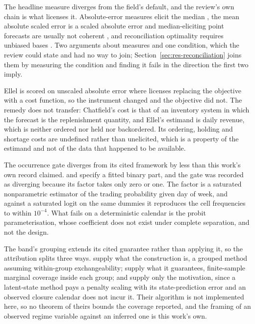 The headline measure diverges from the field's default, and the review's own chain is what
licenses it. Absolute-error measures elicit the median \citep{hewamalage_forecast_2023}, the mean
absolute scaled error is a scaled absolute error and median-eliciting point forecasts are usually
not coherent \citep{kolassa_we_2023}, and reconciliation optimality requires unbiased bases
\citep{wickramasuriya_optimal_2019}. Two arguments about measures and one condition, which the
review could state and had no way to join; Section~\ref{sec:res-reconciliation} joins them by
measuring the condition and finding it fails in the direction the first two imply.

Ellel is scored on unscaled absolute error where \citet{chatfield_all-zero_2007} licenses
replacing the objective with a cost function, so the instrument changed and the objective did
not. The remedy does not transfer: Chatfield's cost is that of an inventory system in which the
forecast is the replenishment quantity, and Ellel's estimand is daily revenue, which is neither
ordered nor held nor backordered. Its ordering, holding and shortage costs are undefined rather
than unelicited, which is a property of the estimand and not of the data that happened to be
available.

The occurrence gate diverges from its cited framework by less than this work's own record
claimed. \citet{cragg_statistical_1971} and \citet{mullahy_specification_1986} specify a fitted
binary part, and the gate was recorded as diverging because its factor takes only zero or one.
The factor is a saturated nonparametric estimator of the trading probability given day of week,
and against a saturated logit on the same dummies it reproduces the cell frequencies to within
$10^{-4}$. What fails on a deterministic calendar is the probit parameterisation, whose
coefficient does not exist under complete separation, and not the design.

The band's grouping extends its cited guarantee rather than applying it, so the attribution
splits three ways. \citet{barber_conformal_2023} supply what the construction is, a grouped
method assuming within-group exchangeability; \citet{stocker_gentle_2025} supply what it
guarantees, finite-sample marginal coverage inside each group; and \citet{sun_conformal_2025}
supply only the motivation, since a latent-state method pays a penalty scaling with its
state-prediction error and an observed closure calendar does not incur it. Their algorithm is not
implemented here, so no theorem of theirs bounds the coverage reported, and the framing of an
observed regime variable against an inferred one is this work's own.

